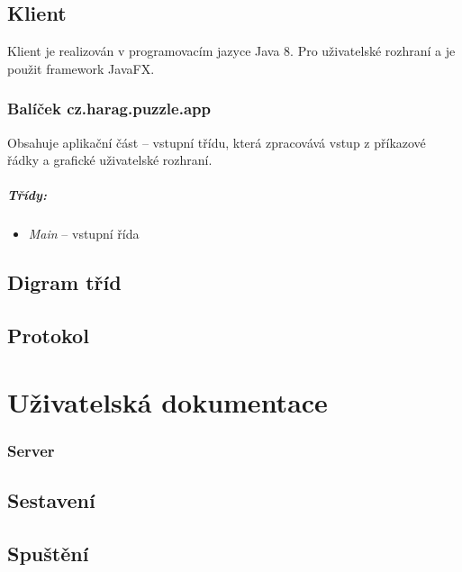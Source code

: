 \documentclass[12pt, a4paper]{report}
\begin{document}
\section{Klient}
Klient je realizován v programovacím jazyce Java 8. Pro uživatelské rozhraní a je použit framework JavaFX.


\subsection{Balíček cz.harag.puzzle.app}
Obsahuje aplikační část -- vstupní třídu, která zpracovává vstup z příkazové řádky a grafické uživatelské rozhraní.

\paragraph{Třídy:}
\begin{itemize}
	\item \emph{Main} -- vstupní řída
	
\end{itemize}


\section{Digram tříd}

\section{Protokol}



\chapter{Uživatelská dokumentace}
\subsection{Server}

\section{Sestavení}
\section{Spuštění}
\end{document}
